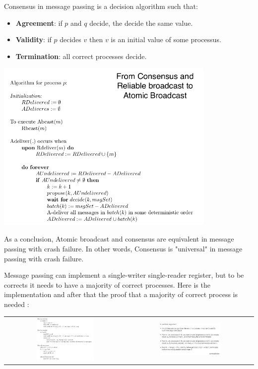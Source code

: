 \documentclass{article}
\theoremstyle{definition}
\begin{document}
Consensus in message passing is a decision algorithm such that:
\begin{itemize}
\item \textbf{Agreement}: if $p$ and $q$ decide, the decide the same value.
\item \textbf{Validity}: if $p$ decides $v$ then $v$ is an initial value of some processus.
\item  \textbf{Termination}: all correct processes decide.
\end{itemize}

\begin{center}
\includegraphics[width=0.8\textwidth]{ABConsensus}
\end{center}

As a conclusion, Atomic broadcast and consensus are equivalent in message passing with crash failure. In other words, Consensus is "universal" in message passing with crash failure.

Message passing can implement a single-writer single-reader register, but to be corrects it needs to have a majority of correct processes. Here is the implementation and after that the proof that a majority of correct process is needed : 

\begin{center}
\begin{tabular}{c c}
\includegraphics[width=0.5\textwidth]{implem_mes_pass}&
\includegraphics[width=0.5\textwidth]{maj_correct_p}
\end{tabular}
\end{center}
\end{document}

